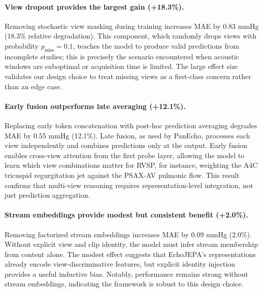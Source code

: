\documentclass{article}
\theoremstyle{plain}
\theoremstyle{definition}
\theoremstyle{remark}
\begin{document}
\paragraph{View dropout provides the largest gain (+18.3\%).}
Removing stochastic view masking during training increases MAE by 0.83 mmHg (18.3\% relative degradation).
This component, which randomly drops views with probability $p_{\text{miss}} = 0.1$, teaches the model to produce valid predictions from incomplete studies; this is precisely the scenario encountered when acoustic windows are suboptimal or acquisition time is limited.
The large effect size validates our design choice to treat missing views as a first-class concern rather than an edge case.

\paragraph{Early fusion outperforms late averaging (+12.1\%).}
Replacing early token concatenation with post-hoc prediction averaging degrades MAE by 0.55 mmHg (12.1\%).
Late fusion, as used by PanEcho, processes each view independently and combines predictions only at the output.
Early fusion enables cross-view attention from the first probe layer, allowing the model to learn which view combinations matter for RVSP, for instance, weighting the A4C tricuspid regurgitation jet against the PSAX-AV pulmonic flow.
This result confirms that multi-view reasoning requires representation-level integration, not just prediction aggregation.

\paragraph{Stream embeddings provide modest but consistent benefit (+2.0\%).}
Removing factorized stream embeddings increases MAE by 0.09 mmHg (2.0\%).
Without explicit view and clip identity, the model must infer stream membership from content alone.
The modest effect suggests that EchoJEPA's representations already encode view-discriminative features, but explicit identity injection provides a useful inductive bias.
Notably, performance remains strong without stream embeddings, indicating the framework is robust to this design choice.


\end{document}
